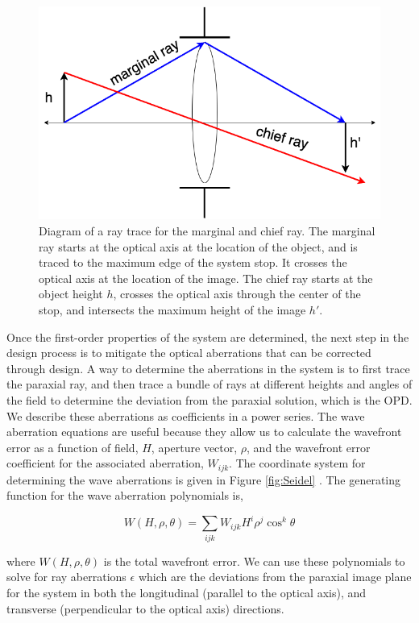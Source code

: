 \begin{figure}
    \centering
    \includegraphics[width=.6\textwidth]{Chapter Materials/Chapter Three Materials/chiefandmarginal.png}
    \caption{Diagram of a ray trace for the marginal and chief ray. The marginal ray starts at the optical axis at the location of the object, and is traced to the maximum edge of the system stop. It crosses the optical axis at the location of the image. The chief ray starts at the object height $h$, crosses the optical axis through the center of the stop, and intersects the maximum height of the image $h'$. }
    \label{fig:chiefray}
\end{figure}



Once the first-order properties of the system are determined, the next step in the design process is to mitigate the optical aberrations that can be corrected through design. A way to determine the aberrations in the system is to first trace the paraxial ray, and then trace a bundle of rays at different heights and angles of the field to determine the deviation from the paraxial solution, which is the OPD. We describe these aberrations as coefficients in a power series. The wave aberration equations are useful because they allow us to calculate the wavefront error as a function of field, $H$, aperture vector, $\rho$, and the wavefront error coefficient for the associated aberration, $W_{ijk}$. The coordinate system for determining the wave aberrations is given in Figure \ref{fig:Seidel} \citep{Liang503}. The generating function for the wave aberration polynomials is,


\begin{equation}
    W(H,\rho, \theta)=\sum_{ijk} W_{ijk} H^i \rho^j \cos^k\theta
\end{equation}

\noindent where $W(H,\rho, \theta)$ is the total wavefront error. We can use these polynomials to solve for ray aberrations $\epsilon$ which are the deviations from the paraxial image plane for the system in both the longitudinal (parallel to the optical axis), and transverse (perpendicular to the optical axis) directions. 


